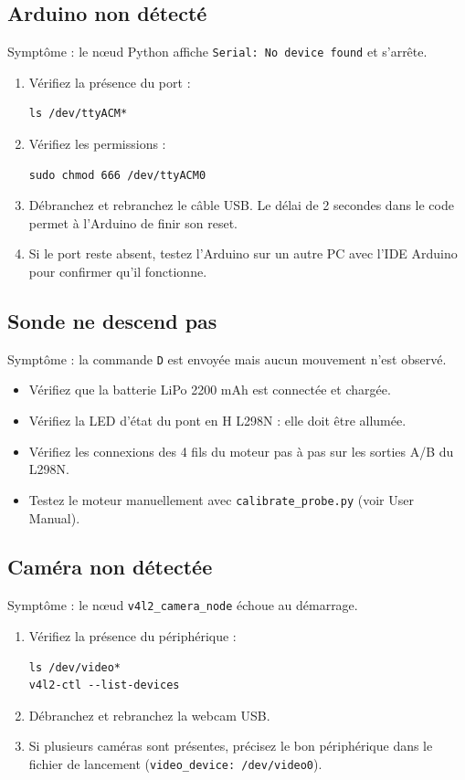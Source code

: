 \documentclass [12pt, a4paper]{article}
\begin{document}
\subsection{Arduino non détecté}
Symptôme : le nœud Python affiche \texttt{Serial: No device found} et s'arrête.
\begin{enumerate}
    \item Vérifiez la présence du port :
\begin{verbatim}
ls /dev/ttyACM*
\end{verbatim}
    \item Vérifiez les permissions :
\begin{verbatim}
sudo chmod 666 /dev/ttyACM0
\end{verbatim}
    \item Débranchez et rebranchez le câble USB. Le délai de 2 secondes dans le code permet à l'Arduino de finir son reset.
    \item Si le port reste absent, testez l'Arduino sur un autre PC avec l'IDE Arduino pour confirmer qu'il fonctionne.
\end{enumerate}

\subsection{Sonde ne descend pas}
Symptôme : la commande \texttt{D} est envoyée mais aucun mouvement n'est observé.
\begin{itemize}
    \item Vérifiez que la batterie LiPo 2200 mAh est connectée et chargée.
    \item Vérifiez la LED d'état du pont en H L298N : elle doit être allumée.
    \item Vérifiez les connexions des 4 fils du moteur pas à pas sur les sorties A/B du L298N.
    \item Testez le moteur manuellement avec \texttt{calibrate\_probe.py} (voir User Manual).
\end{itemize}

\subsection{Caméra non détectée}
Symptôme : le nœud \texttt{v4l2\_camera\_node} échoue au démarrage.
\begin{enumerate}
    \item Vérifiez la présence du périphérique :
\begin{verbatim}
ls /dev/video*
v4l2-ctl --list-devices
\end{verbatim}
    \item Débranchez et rebranchez la webcam USB.
    \item Si plusieurs caméras sont présentes, précisez le bon périphérique dans le fichier de lancement (\texttt{video\_device: /dev/video0}).
\end{enumerate}
\end{document}
